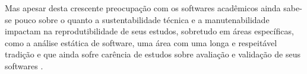 Mas apesar desta crescente preocupação com os softwares acadêmicos
ainda sabe-se pouco sobre o quanto a sustentabilidade técnica
e a manutenabilidade impactam na reprodutibilidade de seus estudos, sobretudo
em áreas específicas, como a análise estática de software, uma área com uma
longa e respeitável tradição e que ainda sofre carência de estudos sobre
avaliação e validação de seus softwares \cite{Li2010, ilyas2016static}.

%
%
%
%
%
%
%
%
%
%
%
%
%
%
%
%

